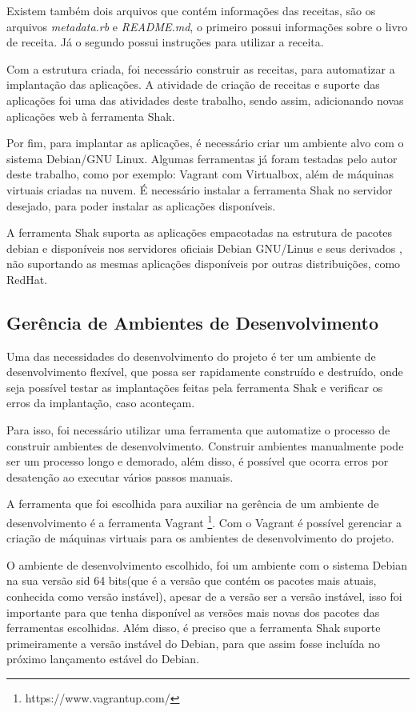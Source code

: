 Existem também dois arquivos que contém informações das receitas, são os 
arquivos \textit{metadata.rb} e \textit{README.md}, o primeiro possui
informações sobre o livro de receita. Já o segundo possui instruções para utilizar a 
receita.

Com a estrutura criada, foi necessário construir as receitas, para automatizar
a implantação das aplicações. A atividade de 
criação de receitas e suporte das aplicações foi uma das atividades 
deste trabalho, sendo assim, adicionando novas aplicações web à ferramenta Shak.

Por fim, para implantar as aplicações, é necessário criar um ambiente alvo com
o sistema Debian/GNU Linux. Algumas ferramentas já foram testadas pelo autor deste
trabalho, como por exemplo: Vagrant com Virtualbox, além de máquinas virtuais criadas
na nuvem. É necessário instalar a ferramenta Shak no servidor desejado, para poder
instalar as aplicações disponíveis.

A ferramenta Shak suporta as aplicações empacotadas na estrutura de pacotes debian
e disponíveis nos servidores oficiais Debian GNU/Linus e seus derivados
, não suportando as mesmas aplicações disponíveis por outras distribuições, como
RedHat.

\subsection{Gerência de Ambientes de Desenvolvimento}

Uma das necessidades do desenvolvimento do projeto é ter um ambiente de desenvolvimento
flexível, que possa ser rapidamente construído e destruído, onde seja possível 
testar as implantações feitas pela ferramenta Shak e verificar os erros da implantação, caso 
aconteçam. 

Para isso, foi necessário utilizar uma ferramenta que automatize o processo de 
construir ambientes de desenvolvimento. Construir ambientes manualmente pode
ser um processo longo e demorado, além disso, é possível que ocorra erros por
desatenção ao executar vários passos manuais.
 
A ferramenta que foi escolhida para auxiliar na gerência de um ambiente de desenvolvimento é
a ferramenta Vagrant \footnote{https://www.vagrantup.com/}. Com o Vagrant é 
possível gerenciar a criação de máquinas
virtuais para os ambientes de desenvolvimento do projeto.

O ambiente de desenvolvimento escolhido, foi um ambiente com o sistema Debian na sua versão
sid 64 bits(que é a versão que contém os pacotes mais atuais, conhecida como versão instável),
apesar de a versão ser a versão instável, isso foi importante para que tenha disponível 
as versões mais novas dos pacotes das ferramentas escolhidas. Além disso, é preciso que a ferramenta Shak suporte primeiramente a versão instável do Debian, para que assim 
fosse incluída no próximo lançamento estável do Debian.

